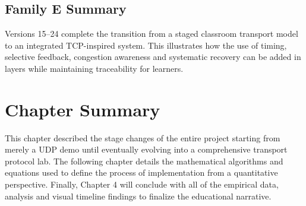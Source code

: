 \clearpage
\subsection{Family E Summary}
Versions 15--24 complete the transition from a staged classroom transport model
to an integrated TCP-inspired system. This illustrates how the use of timing, selective feedback, congestion awareness and systematic recovery can be added in layers while maintaining traceability for learners.

\section{Chapter Summary}
This chapter described the stage changes of the entire project starting from merely a UDP demo until eventually evolving into a comprehensive transport protocol lab. The following chapter details the mathematical algorithms and equations used to define the process of implementation from a quantitative perspective. Finally, Chapter 4 will conclude with all of the empirical data, analysis and visual timeline findings to finalize the educational narrative.